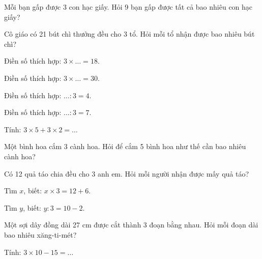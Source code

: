 \begin{ex}
Mỗi bạn gấp được 3 con hạc giấy. Hỏi 9 bạn gấp được tất cả bao nhiêu con hạc giấy?
\end{ex}

\begin{ex}
Cô giáo có 21 bút chì thưởng đều cho 3 tổ. Hỏi mỗi tổ nhận được bao nhiêu bút chì?
\end{ex}

\begin{ex}
Điền số thích hợp: $3 \times \dots = 18$.
\end{ex}

\begin{ex}
Điền số thích hợp: $3 \times \dots = 30$.
\end{ex}

\begin{ex}
Điền số thích hợp: $\dots : 3 = 4$.
\end{ex}

\begin{ex}
Điền số thích hợp: $\dots : 3 = 7$.
\end{ex}

\begin{ex}
Tính: $3 \times 5 + 3 \times 2 = \dots$
\end{ex}

\begin{ex}
Một bình hoa cắm 3 cành hoa. Hỏi để cắm 5 bình hoa như thế cần bao nhiêu cành hoa?
\end{ex}

\begin{ex}
Có 12 quả táo chia đều cho 3 anh em. Hỏi mỗi người nhận được mấy quả táo?
\end{ex}

\begin{ex}
Tìm $x$, biết: $x \times 3 = 12 + 6$.
\end{ex}

\begin{ex}
Tìm $y$, biết: $y : 3 = 10 - 2$.
\end{ex}

\begin{ex}
Một sợi dây đồng dài 27 cm được cắt thành 3 đoạn bằng nhau. Hỏi mỗi đoạn dài bao nhiêu xăng-ti-mét?
\end{ex}

\begin{ex}
Tính: $3 \times 10 - 15 = \dots$
\end{ex}
